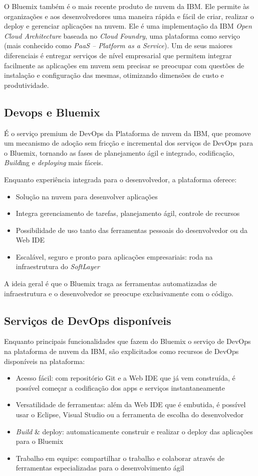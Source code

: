 O Bluemix também é o mais recente produto de nuvem da IBM. Ele permite às organizações e aos desenvolvedores uma maneira rápida e fácil de criar, realizar o deploy e gerenciar aplicações na nuvem. Ele é uma implementação da IBM \textit{Open Cloud Architecture} baseada no \textit{Cloud Foundry}, uma plataforma como serviço (mais conhecido como \textit{PaaS – Platform as a Service}). Um de seus maiores diferenciais é entregar serviços de nível empresarial que permitem integrar facilmente as aplicações em nuvem sem precisar se preocupar com questões de instalação e configuração das mesmas, otimizando dimensões de custo e produtividade.

\subsection{Devops e Bluemix}
É o serviço premium de DevOps da Plataforma de nuvem da IBM, que promove um mecanismo de adoção sem fricção e incremental dos serviços de DevOps para o Bluemix, tornando as fases de planejamento ágil e integrado, codificação, \textit{Build}ing e \textit{deploying} mais fáceis.

Enquanto experiência integrada para o desenvolvedor, a plataforma oferece:
\begin{itemize}
    \item Solução na nuvem para desenvolver aplicações
    \item Integra gerenciamento de tarefas, planejamento ágil, controle de recursos
    \item Possibilidade de uso tanto das ferramentas pessoais do desenvolvedor ou da Web IDE
    \item Escalável, seguro e pronto para aplicações empresariais: roda na infraestrutura do \textit{SoftLayer}
\end{itemize}

A ideia geral é que o Bluemix traga as ferramentas automatizadas de infraestrutura e o desenvolvedor se preocupe exclusivamente com o código.

\subsection{Serviços de DevOps disponíveis}

Enquanto principais funcionalidades que fazem do Bluemix o serviço de DevOps na plataforma de nuvem da IBM, são explicitados como recursos de DevOps disponíveis na plataforma:
\begin{itemize}
    \item Acesso fácil: com repositório Git e a Web IDE que já vem construída, é possível começar a codificação dos apps e serviços instantaneamente
    \item Versatilidade de ferramentas: além da Web IDE que é embutida, é possível usar o Eclipse, Visual Studio ou a ferramenta de escolha do desenvolvedor
    \item \textit{Build} \& deploy: automaticamente construir e realizar o deploy das aplicações para o Bluemix
    \item Trabalho em equipe: compartilhar o trabalho e colaborar através de ferramentas especializadas para o desenvolvimento ágil
\end{itemize}

